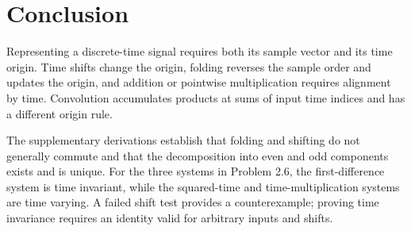 \section{Conclusion}
Representing a discrete-time signal requires both its sample vector and
its time origin. Time shifts change the origin, folding reverses the
sample order and updates the origin, and addition or pointwise
multiplication requires alignment by time. Convolution accumulates
products at sums of input time indices and has a different origin rule.

The supplementary derivations establish that folding and shifting do
not generally commute and that the decomposition into even and odd
components exists and is unique. For the three systems in Problem 2.6,
the first-difference system is time invariant, while the squared-time
and time-multiplication systems are time varying. A failed shift test
provides a counterexample; proving time invariance requires an identity
valid for arbitrary inputs and shifts.
